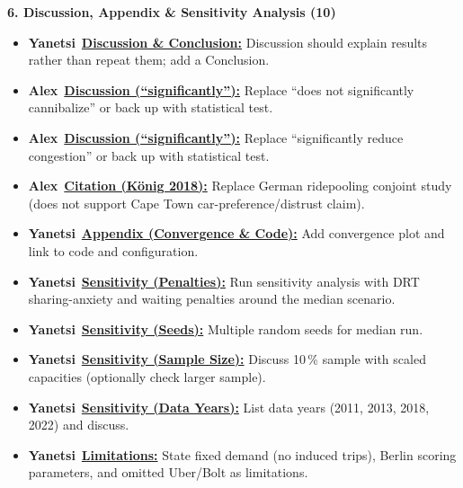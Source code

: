 \documentclass[preprint,12pt,authoryear]{elsarticle}
\newcommand{\todobadge}[2]{\colorbox{#1}{\textbf{\scriptsize #2}}}
\newcommand{\badgeAlex}{\todobadge{blue!25}{Alex}}
\newcommand{\badgeYanetsi}{\todobadge{purple!30}{Yanetsi}}
\begin{document}
\noindent\textbf{6. Discussion, Appendix \& Sensitivity Analysis (10)}
\begin{itemize}\setlength{\itemsep}{1pt}\setlength{\parskip}{0pt}\setlength{\parsep}{0pt}
  \item[$\square$] \badgeYanetsi\ \hyperlink{todo:disc-yanetsi-structure}{\textbf{Discussion \& Conclusion:}} Discussion should explain results rather than repeat them; add a Conclusion.
  \item[$\square$] \badgeAlex\ \hyperlink{todo:disc-sig-cannib}{\textbf{Discussion (``significantly''):}} Replace ``does not significantly cannibalize'' or back up with statistical test.
  \item[$\square$] \badgeAlex\ \hyperlink{todo:disc-sig-cbd}{\textbf{Discussion (``significantly''):}} Replace ``significantly reduce congestion'' or back up with statistical test.
  \item[$\square$] \badgeAlex\ \hyperlink{todo:disc-cite-konig}{\textbf{Citation (König 2018):}} Replace German ridepooling conjoint study (does not support Cape Town car-preference/distrust claim).
  \item[$\square$] \badgeYanetsi\ \hyperlink{todo:app-yanetsi-conv}{\textbf{Appendix (Convergence \& Code):}} Add convergence plot and link to code and configuration.
  \item[$\square$] \badgeYanetsi\ \hyperlink{todo:sens-yanetsi-penalty}{\textbf{Sensitivity (Penalties):}} Run sensitivity analysis with DRT sharing-anxiety and waiting penalties around the median scenario.
  \item[$\square$] \badgeYanetsi\ \hyperlink{todo:sens-yanetsi-seeds}{\textbf{Sensitivity (Seeds):}} Multiple random seeds for median run.
  \item[$\square$] \badgeYanetsi\ \hyperlink{todo:sens-yanetsi-sample}{\textbf{Sensitivity (Sample Size):}} Discuss 10\,\% sample with scaled capacities (optionally check larger sample).
  \item[$\square$] \badgeYanetsi\ \hyperlink{todo:sens-yanetsi-years}{\textbf{Sensitivity (Data Years):}} List data years (2011, 2013, 2018, 2022) and discuss.
  \item[$\square$] \badgeYanetsi\ \hyperlink{todo:sens-yanetsi-limits}{\textbf{Limitations:}} State fixed demand (no induced trips), Berlin scoring parameters, and omitted Uber/Bolt as limitations.
\end{itemize}

\endgroup
\clearpage
{}
\fi
\end{document}
